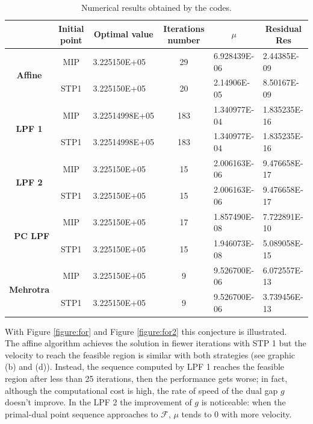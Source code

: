 \documentclass[a4paper,10 pt,titlepage,twoside]{book}
\theoremstyle{plain}
\theoremstyle{definition}
\theoremstyle{remark}
\begin{document}
{{\begin{table}[]\caption{\label{table:PNV}Numerical results obtained by the codes.}
	\begin{tabular}{cclcll}
		\hline		\textbf{} & \textbf{Initial point} & \multicolumn{1}{c}{\textbf{Optimal value}} & \textbf{Iterations number} & \multicolumn{1}{c}{\textbf{$\mu$}} & \multicolumn{1}{c}{\textbf{Residual} Res} \\ \hline
		\multicolumn{1}{c|}{\multirow{2}{*}{\textbf{Affine}}} & MIP & 3.225150E+05 & 29 & 6.928439E-06 & 2.44385E-09 \\
		\multicolumn{1}{c|}{} & STP1 & 3.225150E+05 & 20 & 2.14906E-05 & 8.50167E-09 \\ \hline
		\multicolumn{1}{c|}{\multirow{2}{*}{\textbf{LPF 1}}} & MIP & 3.22514998E+05 & 183 & 1.340977E-04 & 1.835235E-16 \\
		\multicolumn{1}{c|}{} & STP1 & 3.22514998E+05 & 183 & 1.340977E-04 & 1.835235E-16 \\ \hline
		\multicolumn{1}{c|}{\multirow{2}{*}{\textbf{LPF 2}}} & MIP & 3.225150E+05 & 15 & 2.006163E-06 & 9.476658E-17 \\
		\multicolumn{1}{c|}{} & STP1 & 3.225150E+05 & 15 & 2.006163E-06 & 9.476658E-17 \\ \hline
		\multicolumn{1}{r|}{\multirow{2}{*}{\textbf{PC LPF}}} & MIP & 3.225150E+05 & 17 & 1.857490E-08 & 7.722891E-10 \\
		\multicolumn{1}{r|}{} & STP1 & 3.225150E+05 & 15 & 1.946073E-08 & 5.089058E-15 \\ \hline
		\multicolumn{1}{c|}{\multirow{2}{*}{\textbf{Mehrotra}}} & MIP & 3.225150E+05 & 9 & 9.526700E-06 & 6.072557E-13 \\
		\multicolumn{1}{c|}{} & STP1 & 3.225150E+05 & 9 & 9.526700E-06 & 3.739456E-13 \\ \hline
	\end{tabular}
\end{table}
With Figure \ref{figure:for} and Figure \ref{figure:for2} this conjecture is illustrated.\\ 
The affine algorithm achieves the solution in fiewer iterations with STP 1 but the velocity to reach the feasible region is similar with both strategies (see graphic (b) and (d)). Instead, the sequence computed by LPF 1 reaches the feasible region after less than 25 iterations, then the performance gets worse;  in fact, although the computational cost is high, the rate of speed of the dual gap $g$ doesn't improve.  
In the LPF 2 the improvement of $g$ is noticeable: when the primal-dual point sequence approaches to $\mathcal{F}$, $\mu$ tends to 0 with more velocity.\\ 
}}
\end{document}
